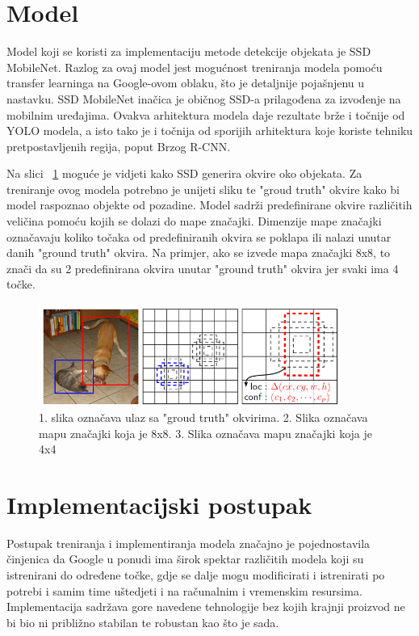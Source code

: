 \section{Model}
Model koji se koristi za implementaciju metode detekcije objekata je SSD MobileNet.
Razlog za ovaj model jest mogućnost treniranja modela pomoću transfer learninga na Google-ovom oblaku, što je detaljnije pojašnjenu u nastavku.
SSD MobileNet inačica je običnog SSD-a prilagođena za izvođenje na mobilnim uređajima.
Ovakva arhitektura modela daje rezultate brže i točnije od YOLO modela, a isto tako je i točnija od 
sporijih arhitektura koje koriste tehniku pretpostavljenih regija, poput Brzog R-CNN. \citep{DBLP:journals/corr/LiuAESR15}

Na slici ~\ref{SSD model} moguće je vidjeti kako SSD generira okvire oko objekata. Za treniranje ovog modela potrebno je unijeti sliku
te "groud truth" okvire kako bi model raspoznao objekte od pozadine. Model sadrži predefinirane okvire različitih veličina pomoću kojih 
se dolazi do mape značajki. Dimenzije mape značajki označavaju koliko točaka od predefiniranih okvira se poklapa ili nalazi unutar danih "ground truth" okvira.
Na primjer, ako se izvede mapa značajki 8x8, to znači da su 2 predefinirana okvira unutar "ground truth" okvira jer svaki ima 4 točke. 

\begin{figure}[htb]
    \centering
    \includegraphics[width=10cm]{img/SSD.png}
    \caption{1. slika označava ulaz sa "groud truth" okvirima. 2. Slika označava mapu značajki koja je 8x8. 3. Slika označava mapu značajki koja je 4x4}
    \label{SSD model}
\end{figure}


\section{Implementacijski postupak}
Postupak treniranja i implementiranja modela značajno je pojednostavila činjenica da Google u ponudi ima širok spektar različitih modela koji su istrenirani
do određene točke, gdje se dalje mogu modificirati i istrenirati po potrebi i samim time uštedjeti i na računalnim i vremenskim resursima. 
Implementacija sadržava gore navedene tehnologije bez kojih krajnji proizvod ne bi bio ni približno stabilan te robustan kao što je sada. 

